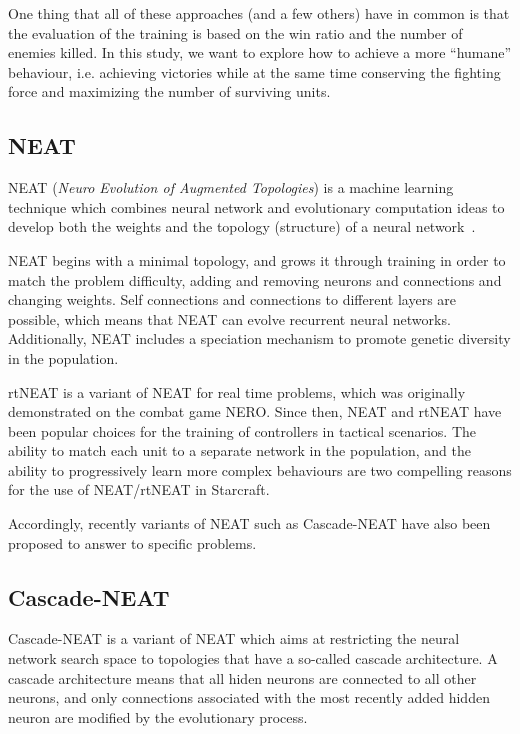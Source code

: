 One thing that all of these approaches (and a few others) have in
common is that the evaluation of the training is based on the win
ratio and the number of enemies killed. In this study, we want to
explore how to achieve a more ``humane'' behaviour, i.e. achieving
victories while at the same time conserving the fighting force and
maximizing the number of surviving units.

\subsection{NEAT}\label{subsec:neat}

NEAT (\emph{Neuro Evolution of Augmented Topologies}) is a machine
learning technique which combines neural network and evolutionary
computation ideas to develop both the weights and the topology
(structure) of a neural network~\cite{Stanley02Neat}.

NEAT begins with a minimal topology, and grows it through training in
order to match the problem difficulty, adding and removing neurons and
connections and changing weights. Self connections and connections to
different layers are possible, which means that NEAT can evolve
recurrent neural networks. Additionally, NEAT includes a speciation
mechanism to promote genetic diversity in the population.

rtNEAT is a variant of NEAT for real time problems, which was
originally demonstrated on the combat game NERO. Since then, NEAT and
rtNEAT have been popular choices for the training of controllers in
tactical scenarios. The ability to match each unit to a separate
network in the population, and the ability to progressively learn more
complex behaviours are two compelling reasons for the use of
NEAT/rtNEAT in Starcraft.

Accordingly, recently variants of NEAT such as Cascade-NEAT have also
been proposed to answer to specific problems.

\subsection{Cascade-NEAT}\label{subsec:cascade-neat}

Cascade-NEAT is a variant of NEAT which aims at restricting the neural
network search space to topologies that have a so-called cascade
architecture. A cascade architecture means that all hiden neurons are
connected to all other neurons, and only connections associated with
the most recently added hidden neuron are modified by the evolutionary
process.

